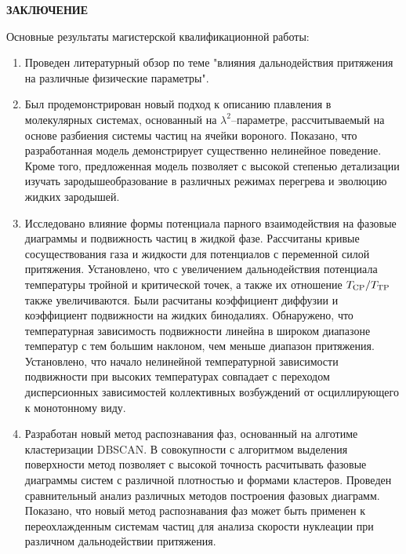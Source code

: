 \newpage
\begin{center}
\textbf{\large ЗАКЛЮЧЕНИЕ}
\end{center}


Основные результаты магистерской квалификационной работы:
\begin{enumerate}

    \item Проведен литературный обзор по теме "влияния дальнодействия притяжения на различные физические параметры".

    \item Был продемонстрирован новый подход к описанию плавления в молекулярных системах, основанный на $\lambda^2$--параметре, рассчитываемый на основе разбиения системы частиц на ячейки вороного. Показано, что разработанная модель демонстрирует существенно нелинейное поведение. Кроме того, предложенная модель позволяет с высокой степенью детализации изучать зародышеобразование в различных режимах перегрева и эволюцию жидких зародышей.

    \item Исследовано влияние формы потенциала парного взаимодействия на фазовые диаграммы и подвижность частиц в жидкой фазе. Рассчитаны кривые сосуществования газа и жидкости для потенциалов с переменной силой притяжения. Установлено, что с увеличением дальнодействия потенциала температуры тройной и критической точек, а также их отношение $T_{\rm CP}/T_{\rm TP}$ также увеличиваются. Были расчитаны коэффициент диффузии и коэффициент подвижности на жидких бинодалиях. Обнаружено, что температурная зависимость подвижности линейна в широком диапазоне температур с тем большим наклоном, чем меньше диапазон притяжения. Установлено, что начало нелинейной температурной зависимости подвижности при высоких температурах совпадает с переходом дисперсионных зависимостей коллективных возбуждений от осциллирующего к монотонному виду.

    \item Разработан новый метод распознавания фаз, основанный на алготиме кластеризации DBSCAN. В совокупности с алгоритмом выделения поверхности метод позволяет с высокой точность расчитывать фазовые диаграммы систем с различной плотностью и формами кластеров. Проведен сравнительный анализ различных методов построения фазовых диаграмм. Показано, что новый метод распознавания фаз может быть применен к переохлажденным системам частиц для анализа скорости нуклеации при различном дальнодействии притяжения.

\end{enumerate}

